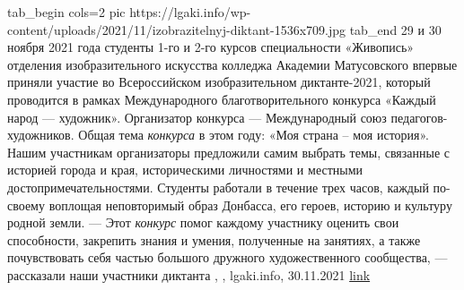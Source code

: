 \ifcmt
  tab_begin cols=2
     pic https://lgaki.info/wp-content/uploads/2021/11/izobrazitelnyj-diktant-1536x709.jpg
  tab_end
\fi
29 и 30 ноября 2021 года студенты 1-го и 2-го курсов специальности «Живопись»
отделения изобразительного искусства колледжа Академии Матусовского впервые
приняли участие во Всероссийском изобразительном диктанте-2021, который
проводится в рамках Международного благотворительного конкурса «Каждый народ —
художник». Организатор конкурса — Международный союз педагогов-художников.
Общая тема \emph{конкурса} в этом году: «Моя страна – моя история». Нашим
участникам организаторы предложили самим выбрать темы, связанные с историей
города и края, историческими личностями и местными достопримечательностями.
Студенты работали в течение трех часов, каждый по-своему воплощая неповторимый
образ Донбасса, его героев, историю и культуру родной земли.  — Этот
\emph{конкурс} помог каждому участнику оценить свои способности, закрепить
знания и умения, полученные на занятиях, а также почувствовать себя частью
большого дружного художественного сообщества, — рассказали наши участники
диктанта
, 
, lgaki.info, 30.11.2021
\href{https://lgaki.info/novosti/vpervye-uchastvovali-vo-vserossijskom-izobrazitelnom-diktante}{link}
